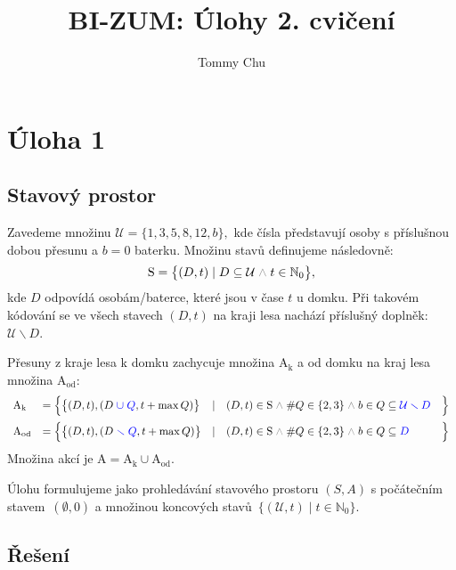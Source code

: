 \documentclass{article}
\title{BI-ZUM: Úlohy 2. cvičení}
\author{Tommy Chu}
\date{}
\newcommand{\Nz}{\mathbb{N}_0}
\newcommand{\U}{\mathcal{U}}
\newcommand{\mS}{\text{S}}
\newcommand{\A}{\text{A}}
\newcommand{\mand}{\;{\color{gray} \land}\;}
\begin{document}
\maketitle

\section*{Úloha 1}

\subsection*{Stavový prostor}

Zavedeme množinu
\(
\U = \{ 1, 3, 5, 8, 12, b \},
\)
kde čísla představují osoby s příslušnou dobou přesunu a $b = 0$ baterku.
Množinu stavů definujeme následovně:
\[
    \mS = \big\{
    (D, t) \mid D \subseteq \U \mand t \in \Nz
    \big\},
\]
kde $D$ odpovídá osobám/baterce, které jsou v čase $t$ u domku.
Při takovém kódování se ve všech stavech $(D, t)$ na kraji lesa nachází příslušný doplněk:~$\U \smallsetminus D$.

Přesuny z kraje lesa k domku zachycuje množina $\A_\text{k}$
a od domku na kraj lesa množina $\A_\text{od}$:
\[
    \begin{array}{llllll}
        \A_\text{k}
         & = \Big\{
        \big\{ (D, t), (D {\color{blue} \;\cup\; Q}, t + \max Q) \big\}
         & \mid
         & (D, t) \in \mS \mand \# Q \in \{2, 3\}
        \mand b \in Q \subseteq  {\color{blue} \U\smallsetminus D}
         & \Big\}

        \\[3mm]

        \A_\text{od}
         & = \Big\{
        \big\{ (D, t), (D {\color{blue} \;\smallsetminus\; Q}, t + \max Q) \big\}
         & \mid
         & (D, t) \in \mS \mand \# Q \in \{2, 3\}
        \mand b \in Q \subseteq {\color{blue} D}
         & \Big\}
    \end{array}
\]
Množina akcí je $\A = \A_\text{k} \cup \A_\text{od}$.

Úlohu formulujeme jako prohledávání stavového prostoru $(S, A)$ s počátečním stavem~$(\emptyset, 0)$ a množinou koncových stavů~$\{ (\U, t) \mid t \in \Nz \}$.

\subsection*{Řešení}
\end{document}
